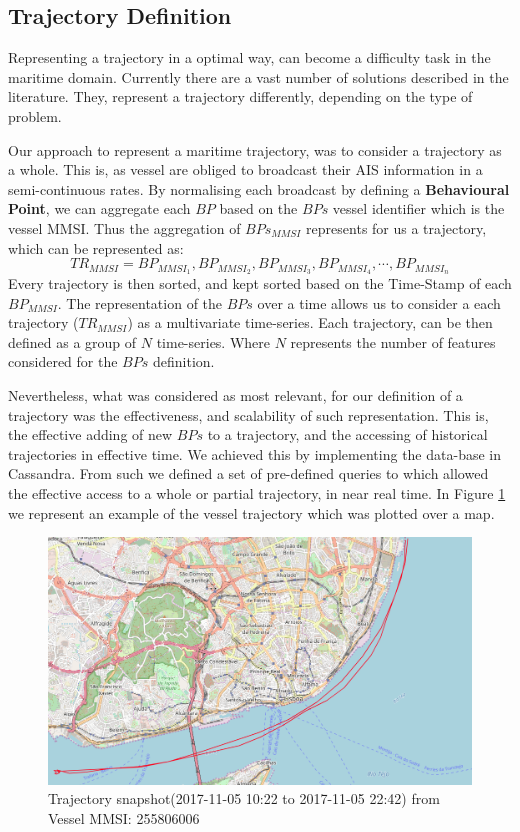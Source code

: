 \subsection{Trajectory Definition}
\label{subsection: Trajectory Definition}
Representing a trajectory in a optimal way, can become a difficulty task in the maritime domain. Currently there are a vast number of solutions described in the literature. They, represent a trajectory differently, depending on the type of problem.

Our approach to represent a maritime trajectory, was to consider a trajectory as a whole. This is, as vessel are obliged to broadcast their AIS information in a semi-continuous rates. By normalising each broadcast by defining a \textbf{Behavioural Point}, we can aggregate each $BP$ based on the $BPs$ vessel identifier which is the vessel MMSI. Thus the aggregation of $BPs_{MMSI}$ represents for us a trajectory, which can be represented as:
\[TR_{MMSI} = BP_{MMSI_1}, BP_{MMSI_2}, BP_{MMSI_3}, BP_{MMSI_4}, \cdots , BP_{MMSI_n}\]
Every trajectory is then sorted, and kept sorted based on the Time-Stamp of each $BP_{MMSI}$. The representation of the $BPs$ over a time allows us to consider a each trajectory ($TR_{MMSI}$) as a multivariate time-series.
Each trajectory, can be then defined as a group of $N$ time-series. Where $N$ represents the number of features considered for the $BPs$ definition.

Nevertheless, what was considered as most relevant, for our definition of a trajectory was the effectiveness, and scalability of such representation. This is, the effective adding of new $BPs$ to a trajectory, and the accessing of historical trajectories in effective time. We achieved this by implementing the data-base in Cassandra. From such we defined a set of pre-defined queries to which allowed the effective access to a whole or partial trajectory, in near real time.
In Figure \ref{fig: TrajectorySMM_example} we represent an example of the vessel trajectory which was plotted over a map. 

\begin{figure}[H]
\centering
\includegraphics[width=\textwidth]{figures/Ch3/traj_example.png}
\caption{Trajectory snapshot(2017-11-05 10:22 to 2017-11-05 22:42) from Vessel MMSI: 255806006}
\label{fig: TrajectorySMM_example}
\end{figure}

